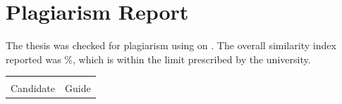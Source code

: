\clearpage
\chapter*{Plagiarism Report}

The thesis was checked for plagiarism using  on . The overall similarity index reported
was \todoph{XX}\%, which is within the limit prescribed by the university.

\vspace{8mm}
\noindent{}


\vspace{20mm}
\noindent
\begin{tabular}{@{}p{}p{}@{}}
\textbf{\candidatename} & \textbf{\guidename}\\
Candidate & Guide\\
\end{tabular}
